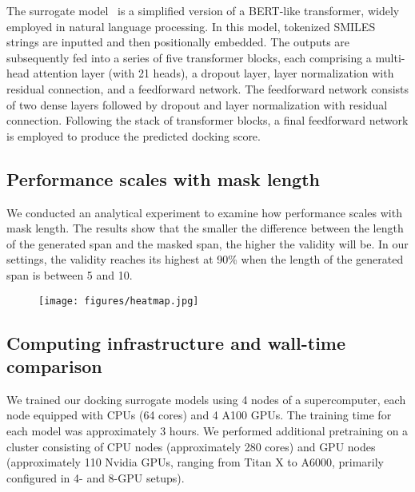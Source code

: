 {The surrogate model~\citep{vasan23} is a simplified version of a BERT-like transformer, widely employed in natural language processing. In this model, tokenized SMILES strings are inputted and then positionally embedded. The outputs are subsequently fed into a series of five transformer blocks, each comprising a multi-head attention layer (with 21 heads), a dropout layer, layer normalization with residual connection, and a feedforward network. The feedforward network consists of two dense layers followed by dropout and layer normalization with residual connection. Following the stack of transformer blocks, a final feedforward network is employed to produce the predicted docking score.} 














\subsection{Performance scales with mask length}
We conducted an analytical experiment to examine how performance scales with mask length. The results show that the smaller the difference between the length of the generated span and the masked span, the higher the validity will be. In our settings, the validity reaches its highest at 90\% when the length of the generated span is between 5 and 10.

\begin{figure*}[ht!]

    \begin{subfigure}{1\textwidth}
        \centering
        \texttt{[image: figures/heatmap.jpg]}
    \end{subfigure}\hfil
    \caption{The x-axis of this heatmap is the number of tokens that are generated, and the y-axis of this heatmap is the number of tokens that are masked in prompt.  
    }
\end{figure*}




\subsection{{Computing infrastructure {and wall-time comparison}}}\label{app:computing_infrastructure}
{We trained our docking surrogate models using 4 nodes of a supercomputer, each node equipped with CPUs (64 cores) and 4 A100 GPUs. The training time for each model was approximately 3 hours.} 
We performed additional pretraining on a cluster consisting of CPU nodes (approximately 280 cores) and GPU nodes (approximately 110 Nvidia GPUs, ranging from Titan X to A6000, primarily configured in 4- and 8-GPU setups). 

